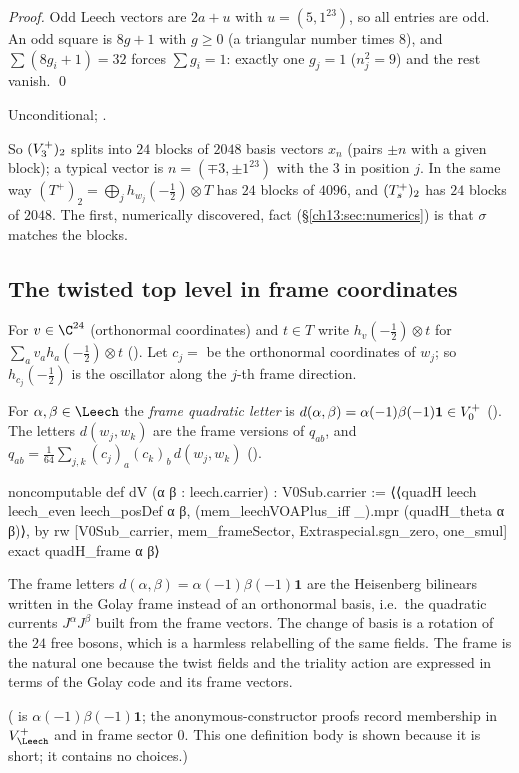 \noindent\emph{Proof.} Odd Leech vectors are $2a+u$ with $u=(5,1^{23})$, so all entries are odd. An odd
square is $8g+1$ with $g\ge0$ (a triangular number times $8$), and $\sum(8g_i+1)=32$ forces
$\sum g_i=1$: exactly one $g_j=1$ ($n_j^2=9$) and the rest vanish. \qed
\begin{status}Unconditional; .\end{status}

So $(V_3^{+})_2$ splits into $24$ blocks of $2048$ basis vectors $x_n$ (pairs $\pm n$ with a given
block); a typical vector is $n=(\mp3,\pm1^{23})$ with the $3$ in position $j$. In the same way
$(T^+)_2=\bigoplus_j h_{w_j}(-\tfrac12)\otimes T$ has $24$ blocks of $4096$, and $(T_{s}^{+})_2$ has $24$
blocks of $2048$. The first, numerically discovered, fact (\S\ref{ch13:sec:numerics}) is that $\sigma$
matches the blocks.

\subsection{The twisted top level in frame coordinates}
For $v\in\C^{24}$ (orthonormal coordinates) and $t\in T$ write $h_v(-\tfrac12)\otimes t$ for
$\sum_av_a h_a(-\tfrac12)\otimes t$ (). Let $c_j=$  be the orthonormal coordinates
of $w_j$; so $h_{c_j}(-\tfrac12)$ is the oscillator along the $j$-th frame direction.

\begin{definition}\label{ch13:def:dV}
For $\alpha,\beta\in\Leech$ the \emph{frame quadratic letter} is $d(\alpha,\beta)=\alpha(-1)\beta(-1)\mathbf
1\in V_0^{+}$ (). The letters $d(w_j,w_k)$ are the frame versions of $q_{ab}$, and
$q_{ab}=\tfrac1{64}\sum_{j,k}(c_j)_a(c_k)_b\,d(w_j,w_k)$ ().
\end{definition}
\begin{leancode}
noncomputable def dV (α β : leech.carrier) : V0Sub.carrier :=
  ⟨⟨quadH leech leech_even leech_posDef α β, (mem_leechVOAPlus_iff _).mpr (quadH_theta α β)⟩, by
    rw [V0Sub_carrier, mem_frameSector, Extraspecial.sgn_zero, one_smul]
    exact quadH_frame α β⟩
\end{leancode}
\begin{physics}
The frame letters $d(\alpha,\beta)=\alpha(-1)\beta(-1)\mathbf 1$ are the Heisenberg bilinears written in the Golay frame instead of an orthonormal basis, i.e.\ the quadratic currents $J^\alpha J^\beta$ built from the frame vectors. The change of basis is a rotation of the $24$ free bosons, which is a harmless relabelling of the same fields. The frame is the natural one because the twist fields and the triality action are expressed in terms of the Golay code and its frame vectors.
\end{physics}
( is $\alpha(-1)\beta(-1)\mathbf 1$; the anonymous-constructor proofs record membership
in $V_\Leech^+$ and in frame sector $0$. This one definition body is shown because it is short; it
contains no choices.)

